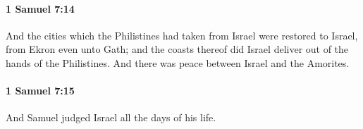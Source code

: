 		\paragraph{1 Samuel 7:14} %
			\label{1SAMUEL-7-14}

			And the cities which the Philistines had taken from Israel were restored to Israel, from Ekron even unto Gath; and the coasts thereof did Israel deliver out of the hands of the Philistines. And there was peace between Israel and the Amorites.


		\paragraph{1 Samuel 7:15} %
			\label{1SAMUEL-7-15}

			And Samuel judged Israel all the days of his life.



